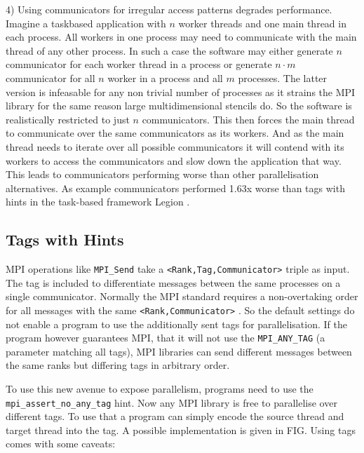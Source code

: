\documentclass[sigconf]{acmart}
\begin{document}
4) Using communicators for irregular access patterns degrades performance.
Imagine a taskbased application with $n$ worker threads and one main thread in each process.
All workers in one process may need to communicate with the main thread of any other process.
In such a case the software may either generate $n$ communicator for each worker thread in a process or generate $n \cdot m$ communicator for all $n$ worker in a process and all $m$ processes.
The latter version is infeasable for any non trivial number of processes as it strains the MPI library for the same reason large multidimensional stencils do.
So the software is realistically restricted to just $n$ communicators.
This then forces the main thread to communicate over the same communicators as its workers.
And as the main thread needs to iterate over all possible communicators it will contend with its workers to access the communicators and slow down the application that way.
This leads to communicators performing worse than other parallelisation alternatives.
As example communicators performed 1.63x worse than tags with hints in the task-based framework Legion \cite{zambreLogicalParallel2021}.

\subsection{Tags with Hints}

MPI operations like \verb|MPI_Send| take a \verb|<Rank,Tag,Communicator>| triple as input.
The tag is included to differentiate messages between the same processes on a single communicator.
Normally the MPI standard requires a non-overtaking order for all messages with the same \verb|<Rank,Communicator>| \cite{mpi40}.
So the default settings do not enable a program to use the additionally sent tags for parallelisation.
If the program however guarantees MPI, that it will not use the \verb|MPI_ANY_TAG| (a parameter matching all tags), MPI libraries can send different messages between the same ranks but differing tags in arbitrary order.

To use this new avenue to expose parallelism, programs need to use the \verb|mpi_assert_no_any_tag| hint.
Now any MPI library is free to parallelise over different tags.
To use that a program can simply encode the source thread and target thread into the tag.
A possible implementation is given in FIG. %
Using tags comes with some caveats:
\end{document}
